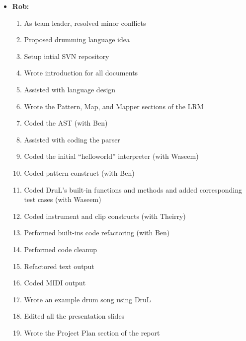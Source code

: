 \begin{itemize}

\item \textbf{Rob:}
\begin{enumerate}
	\item As team leader, resolved minor conflicts
	\item Proposed drumming language idea
	\item Setup intial SVN repository
	\item Wrote introduction for all documents
	\item Assisted with language design
	\item Wrote the Pattern, Map, and Mapper sections of the LRM
	\item Coded the AST (with Ben)
	\item Assisted with coding the parser
	\item Coded the initial ``helloworld'' interpreter (with Waseem)
	\item Coded pattern construct (with Ben)
	\item Coded DruL's built-in functions and methods and added corresponding test cases (with Waseem)
	\item Coded instrument and clip constructs (with Theirry)
	\item Performed built-ins code refactoring (with Ben)
	\item Performed code cleanup
	\item Refactored text output
	\item Coded MIDI output
	\item Wrote an example drum song using DruL
	\item Edited all the presentation slides
	\item Wrote the Project Plan section of the report
\end{enumerate}


\end{itemize}
